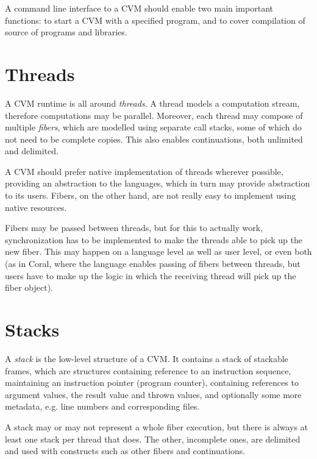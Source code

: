 A command line interface to a CVM should enable two main important functions: to start a CVM with a specified program, and to cover compilation of source of programs and libraries. 






\section{Threads}

A CVM runtime is all around {\em threads}. A thread models a computation stream, therefore computations may be parallel. Moreover, each thread may compose of multiple {\em fibers}, which are modelled using separate call stacks, some of which do not need to be complete copies. This also enables continuations, both unlimited and delimited. 

A CVM should prefer native implementation of threads wherever possible, providing an abstraction to the languages, which in turn may provide abstraction to its users. Fibers, on the other hand, are not really easy to implement using native resources. 

Fibers may be passed between threads, but for this to actually work, synchronization has to be implemented to make the threads able to pick up the new fiber. This may happen on a language level as well as user level, or even both (as in Coral, where the language enables passing of fibers between threads, but users have to make up the logic in which the receiving thread will pick up the fiber object). 





\section{Stacks}

A {\em stack} is the low-level structure of a CVM. It contains a stack of stackable frames, which are structures containing reference to an instruction sequence, maintaining an instruction pointer (program counter), containing references to argument values, the result value and thrown values, and optionally some more metadata, e.g. line numbers and corresponding files. 

A stack may or may not represent a whole fiber execution, but there is always at least one stack per thread that does. The other, incomplete ones, are delimited and used with constructs such as other fibers and continuations. 

